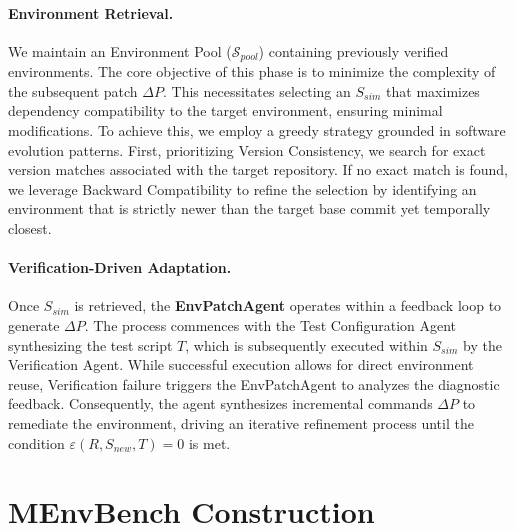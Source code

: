 \documentclass{article}
\theoremstyle{plain}
\theoremstyle{definition}
\theoremstyle{remark}
\begin{document}
\paragraph{Environment Retrieval.}
We maintain an Environment Pool ($\mathcal{S}_{pool}$) containing previously verified environments. 
The core objective of this phase is to minimize the complexity of the subsequent patch $\Delta P$. This necessitates selecting an $S_{sim}$ that maximizes dependency compatibility to the target environment, ensuring minimal modifications.
To achieve this, we employ a greedy strategy grounded in software evolution patterns.
First, prioritizing Version Consistency, we search for exact version matches associated with the target repository.
If no exact match is found, we leverage Backward Compatibility to refine the selection by identifying an environment that is strictly newer than the target base commit yet temporally closest.

\paragraph{Verification-Driven Adaptation.}
Once $S_{sim}$ is retrieved, the \textbf{EnvPatchAgent} operates within a feedback loop to generate $\Delta P$.
The process commences with the Test Configuration Agent synthesizing the test script $T$, which is subsequently executed within $S_{sim}$ by the Verification Agent.
While successful execution allows for direct environment reuse, Verification failure triggers the EnvPatchAgent to analyzes the diagnostic feedback. 
Consequently, the agent synthesizes incremental commands $\Delta P$ to remediate the environment, driving an iterative refinement process until the condition $\varepsilon(R, S_{new}, T) = 0$ is met.

\section{MEnvBench Construction}
\label{sec:menvbench}
\end{document}
